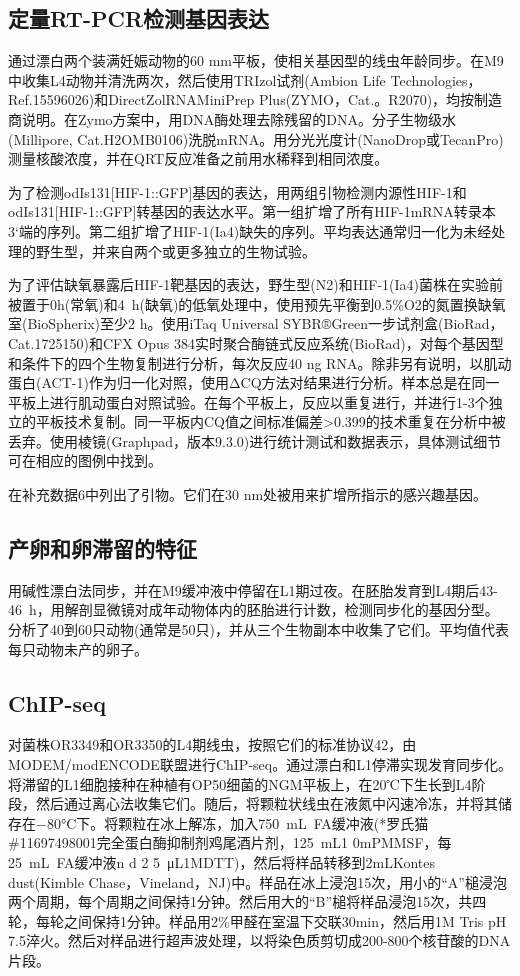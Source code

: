\documentclass{ctexart}
\begin{document}
    \subsection{定量RT-PCR检测基因表达}

    通过漂白两个装满妊娠动物的60 mm平板，使相关基因型的线虫年龄同步。在M9中收集L4动物并清洗两次，然后使用TRIzol试剂(Ambion Life Technologies，Ref.15596026)和DirectZolRNAMiniPrep Plus(ZYMO，Cat.。R2070)，均按制造商说明。在Zymo方案中，用DNA酶处理去除残留的DNA。分子生物级水(Millipore, Cat.H2OMB0106)洗脱mRNA。用分光光度计(NanoDrop或TecanPro)测量核酸浓度，并在QRT反应准备之前用水稀释到相同浓度。

    为了检测odIs131[HIF-1::GFP]基因的表达，用两组引物检测内源性HIF-1和odIs131[HIF-1::GFP]转基因的表达水平。第一组扩增了所有HIF-1mRNA转录本3‘端的序列。第二组扩增了HIF-1(Ia4)缺失的序列。平均表达通常归一化为未经处理的野生型，并来自两个或更多独立的生物试验。
    
    为了评估缺氧暴露后HIF-1靶基因的表达，野生型(N2)和HIF-1(Ia4)菌株在实验前被置于0h(常氧)和4~h(缺氧)的低氧处理中，使用预先平衡到0.5\%O2的氮置换缺氧室(BioSpherix)至少2 h。使用iTaq Universal SYBR®Green一步试剂盒(BioRad，Cat.1725150)和CFX Opus 384实时聚合酶链式反应系统(BioRad)，对每个基因型和条件下的四个生物复制进行分析，每次反应40 ng RNA。除非另有说明，以肌动蛋白(ACT-1)作为归一化对照，使用ΔCQ方法对结果进行分析。样本总是在同一平板上进行肌动蛋白对照试验。在每个平板上，反应以重复进行，并进行1-3个独立的平板技术复制。同一平板内CQ值之间标准偏差>0.399的技术重复在分析中被丢弃。使用棱镜(Graphpad，版本9.3.0)进行统计测试和数据表示，具体测试细节可在相应的图例中找到。

    在补充数据6中列出了引物。它们在30 nm处被用来扩增所指示的感兴趣基因。

    \subsection{产卵和卵滞留的特征}

    用碱性漂白法同步，并在M9缓冲液中停留在L1期过夜。在胚胎发育到L4期后43-46~h，用解剖显微镜对成年动物体内的胚胎进行计数，检测同步化的基因分型。分析了40到60只动物(通常是50只)，并从三个生物副本中收集了它们。平均值代表每只动物未产的卵子。

    \subsection{ChIP-seq}

    对菌株OR3349和OR3350的L4期线虫，按照它们的标准协议42，由MODEM/modENCODE联盟进行ChIP-seq。通过漂白和L1停滞实现发育同步化。将滞留的L1细胞接种在种植有OP50细菌的NGM平板上，在20℃下生长到L4阶段，然后通过离心法收集它们。随后，将颗粒状线虫在液氮中闪速冷冻，并将其储存在−80°C下。将颗粒在冰上解冻，加入750~mL~FA缓冲液(*罗氏猫\#11697498001完全蛋白酶抑制剂鸡尾酒片剂，125~mL1 0mPMMSF，每25~mL~FA缓冲液n d 2 5~μL1MDTT)，然后将样品转移到2mLKontes dust(Kimble Chase，Vineland，NJ)中。样品在冰上浸泡15次，用小的“A”槌浸泡两个周期，每个周期之间保持1分钟。然后用大的“B”槌将样品浸泡15次，共四轮，每轮之间保持1分钟。样品用2\%甲醛在室温下交联30min，然后用1M Tris pH 7.5淬火。然后对样品进行超声波处理，以将染色质剪切成200-800个核苷酸的DNA片段。
\end{document}
